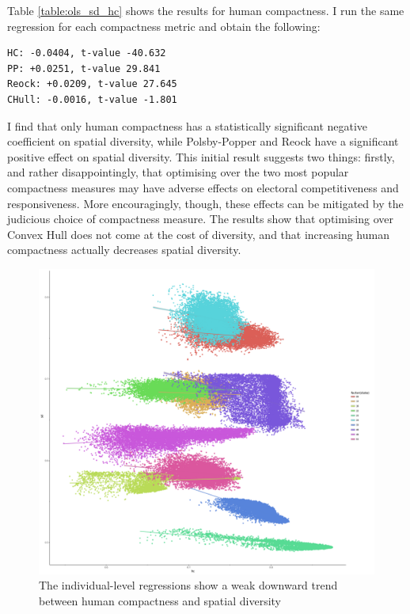 \documentclass[]{article}
\begin{document}
Table \ref{table:ols_sd_hc} shows the results for human compactness. I
run the same regression for each compactness metric and obtain the
following:

\begin{verbatim}
HC: -0.0404, t-value -40.632
PP: +0.0251, t-value 29.841
Reock: +0.0209, t-value 27.645
CHull: -0.0016, t-value -1.801
\end{verbatim}

I find that only human compactness has a statistically significant
negative coefficient on spatial diversity, while Polsby-Popper and Reock
have a significant positive effect on spatial diversity. This initial
result suggests two things: firstly, and rather disappointingly, that
optimising over the two most popular compactness measures may have
adverse effects on electoral competitiveness and responsiveness. More
encouragingly, though, these effects can be mitigated by the judicious
choice of compactness measure. The results show that optimising over
Convex Hull does not come at the cost of diversity, and that increasing
human compactness actually decreases spatial diversity.

\begin{figure}
\centering
\includegraphics{../30_results/individual_regressions.png}
\caption{The individual-level regressions show a weak downward trend
between human compactness and spatial diversity\label{indiv_reg}}
\end{figure}
\end{document}
